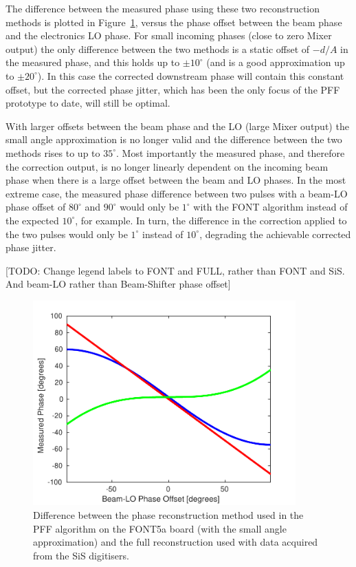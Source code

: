 The difference between the measured phase using these two reconstruction methods is plotted in Figure~\ref{f:phaseRecDiff}, versus the phase offset between the beam phase and the electronics LO phase. For small incoming phases (close to zero Mixer output) the only difference between the two methods is a static offset of \(-d/A\) in the measured phase, and this holds up to \(\pm10^\circ\) (and is a good approximation up to \(\pm20^\circ\)). In this case the corrected downstream phase will contain this constant offset, but the corrected phase jitter, which has been the only focus of the PFF prototype to date, will still be optimal. 

With larger offsets between the beam phase and the LO (large Mixer output) the small angle approximation is no longer valid and the difference between the two methods rises to up to \(35^\circ\). Most importantly the measured phase, and therefore the correction output, is no longer linearly dependent on the incoming beam phase when there is a large offset between the beam and LO phases. In the most extreme case, the measured phase difference between two pulses with a beam-LO phase offset of \(80^\circ\) and \(90^\circ\) would only be \(1^\circ\) with the FONT algorithm instead of the expected \(10^\circ\), for example. In turn, the difference in the correction applied to the two pulses would only be \(1^\circ\) instead of \(10^\circ\), degrading the achievable corrected phase jitter.

[TODO: Change legend labels to FONT and FULL, rather than FONT and SiS. And beam-LO rather than Beam-Shifter phase offset]

\begin{figure}
  \centering
  \includegraphics[width=0.9\textwidth]{Figures/commissioning/phaseRecDiff}
  \caption{Difference between the phase reconstruction method used in the PFF algorithm on the FONT5a board (with the small angle approximation) and the full reconstruction used with data acquired from the SiS digitisers.}
  \label{f:phaseRecDiff}
\end{figure}


